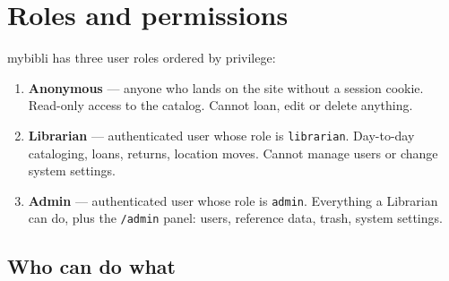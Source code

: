 \chapter{Roles and permissions}
\label{ch:roles}

mybibli has three user roles ordered by privilege:

\begin{enumerate}
  \item \textbf{Anonymous} — anyone who lands on
        the site without a session cookie. Read-only access to the
        catalog. Cannot loan, edit or delete anything.
  \item \textbf{Librarian} — authenticated user
        whose role is \texttt{librarian}. Day-to-day cataloging,
        loans, returns, location moves. Cannot manage users or
        change system settings.
  \item \textbf{Admin} — authenticated user whose
        role is \texttt{admin}. Everything a Librarian can do, plus
        the \texttt{/admin} panel: users, reference data, trash,
        system settings.
\end{enumerate}

\section{Who can do what}

